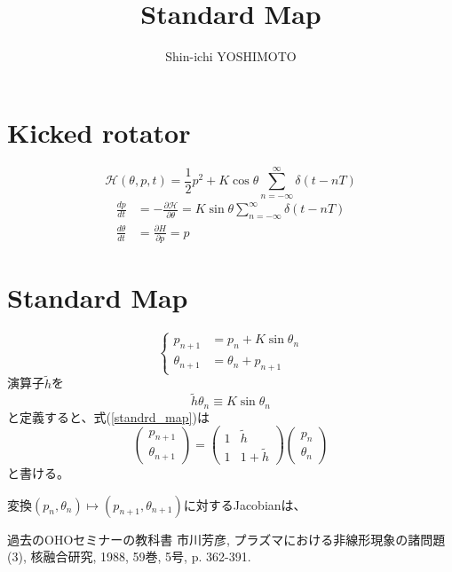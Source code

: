\documentclass[]{jlreq}
\begin{document}
\title{Standard Map}
\author{Shin-ichi YOSHIMOTO}
\maketitle
\tableofcontents
\clearpage

\section{Kicked rotator}
%
\begin{equation}
    \mathcal{H}(\theta, p, t) = \frac{1}{2}p^2 + K \cos\theta \sum_{n=-\infty}^{\infty}\delta(t - n T)
\end{equation}
%
\begin{align}
    \frac{dp}{dt} &= -\frac{\partial \mathcal{H}}{\partial \theta} = K \sin\theta \sum_{n=-\infty}^{\infty}\delta(t - n T)\\
    \frac{d\theta}{dt} &= \frac{\partial H}{\partial p} = p
\end{align}
%
\section{Standard Map}
%
\begin{equation}
    \left\{
    \begin{aligned}
        p_{n+1} &= p_n + K\sin\theta_n \\
        \theta_{n+1} &= \theta_n + p_{n+1}
        \label{standrd_map}
    \end{aligned}
    \right.
\end{equation}
%
演算子$\tilde{h}$を
%
\begin{equation}
    \tilde{h}\theta_n \equiv K \sin\theta_n
\end{equation}
%
と定義すると、式(\ref{standrd_map})は
%
\begin{equation}
    \begin{pmatrix}
        p_{n+1}\\
        \theta_{n+1}
    \end{pmatrix}
    =
    \begin{pmatrix}
        1 & \tilde{h} \\
        1 & 1+\tilde{h}
    \end{pmatrix}
    \begin{pmatrix}
        p_n \\
        \theta_n
    \end{pmatrix}
\end{equation}
%
と書ける。

変換$(p_n, \theta_n)\mapsto (p_{n+1}, \theta_{n+1})$に対するJacobianは、
%
\begin{thebibliography}{9}
    過去のOHOセミナーの教科書
    市川芳彦, プラズマにおける非線形現象の諸問題 (3), 核融合研究, 1988, 59巻, 5号, p. 362-391.
  \end{thebibliography}
%
\end{document}
